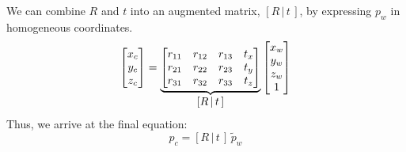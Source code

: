 We can combine $R$ and $t$ into an augmented matrix, $[R\,|\,t\,]$, by expressing $p_w$ in homogeneous coordinates.
\begin{equation}
    \begin{bmatrix}
        x_c \\ y_c \\ z_c
    \end{bmatrix}
    =
    \underbrace{
        \begin{bmatrix}
            r_{11} & r_{12} & r_{13} & t_x \\
            r_{21} & r_{22} & r_{23} & t_y \\
            r_{31} & r_{32} & r_{33} & t_z \\
        \end{bmatrix}
    }_{\mathlarger{[R\,|\,t\,]}}
    \begin{bmatrix}
        x_w \\ y_w \\ z_w \\ 1
    \end{bmatrix}
\end{equation}
Thus, we arrive at the final equation:
\begin{equation}
    p_c=[R\,|\,t\,] \,\widetilde{p}_w \label{eq:pc}
\end{equation}

